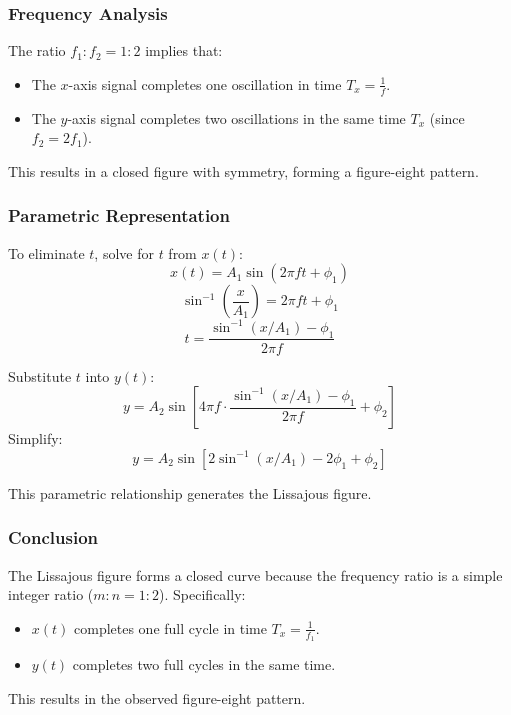\documentclass[12pt,a4paper]{report}
\begin{document}
\subsubsection*{Frequency Analysis}
The ratio $f_1 : f_2 = 1 : 2$ implies that:
\begin{itemize}
    \item The $x$-axis signal completes one oscillation in time $T_x = \frac{1}{f}$.
    \item The $y$-axis signal completes two oscillations in the same time $T_x$ (since $f_2 = 2f_1$).
\end{itemize}
This results in a closed figure with symmetry, forming a figure-eight pattern.

\subsubsection*{Parametric Representation}
To eliminate $t$, solve for $t$ from $x(t)$:
\[
x(t) = A_1 \sin(2 \pi f t + \phi_1)
\]
\[
\sin^{-1}\left(\frac{x}{A_1}\right) = 2 \pi f t + \phi_1
\]
\[
t = \frac{\sin^{-1}(x / A_1) - \phi_1}{2 \pi f}
\]

Substitute $t$ into $y(t)$:
\[
y = A_2 \sin\left[4 \pi f \cdot \frac{\sin^{-1}(x / A_1) - \phi_1}{2 \pi f} + \phi_2 \right]
\]
Simplify:
\[
y = A_2 \sin\left[2 \sin^{-1}(x / A_1) - 2 \phi_1 + \phi_2 \right]
\]

This parametric relationship generates the Lissajous figure.

\subsubsection*{Conclusion}
The Lissajous figure forms a closed curve because the frequency ratio is a simple integer ratio ($m : n = 1 : 2$). Specifically:
\begin{itemize}
    \item $x(t)$ completes one full cycle in time $T_x = \frac{1}{f_1}$.
    \item $y(t)$ completes two full cycles in the same time.
\end{itemize}
This results in the observed figure-eight pattern.
\end{document}
